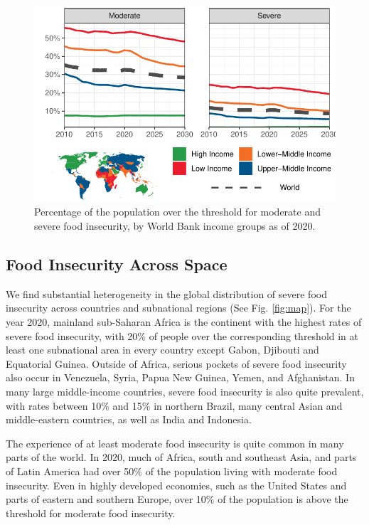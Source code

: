 \documentclass[titlepage]{article}
\begin{document}
\begin{figure}[H]
  \centering
  \includegraphics[width=\linewidth]{img/Rates.pdf}
  \caption{Percentage of the population over the threshold for moderate and severe food insecurity, by World Bank income groups as of 2020.}
  \label{fig:rates}
\end{figure}


\subsection{Food Insecurity Across Space}
We find substantial heterogeneity in the global distribution of severe food insecurity across countries and subnational regions (See Fig. \ref{fig:map}).  For the year 2020, mainland sub-Saharan Africa is the continent with the highest rates of severe food insecurity, with 20\% of people over the corresponding threshold in at least one subnational area in every country except Gabon, Djibouti and Equatorial Guinea.  Outside of Africa, serious pockets of severe food insecurity also occur in Venezuela, Syria, Papua New Guinea, Yemen, and Afghanistan.  In many large middle-income countries, severe food insecurity is also quite prevalent, with rates between 10\% and 15\% in northern Brazil, many central Asian and middle-eastern countries, as well as India and Indonesia.

The experience of at least moderate food insecurity is quite common in many parts of the world.  In 2020, much of Africa, south and southeast Asia, and parts of Latin America had over 50\% of the population living with moderate food insecurity.  Even in highly developed economies, such as the United States and parts of eastern and southern Europe, over 10\% of the population is above the threshold for moderate food insecurity.
\end{document}
